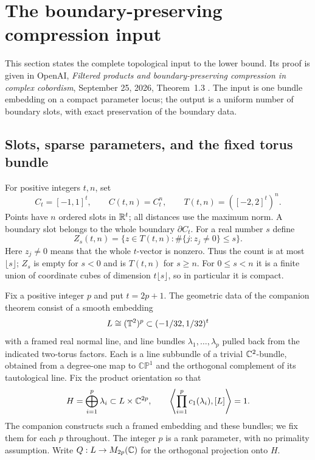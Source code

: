 \section{The boundary-preserving compression input}
\label{sec:compression-interface}

This section states the complete topological input to the lower bound.
Its proof is given in OpenAI, \emph{Filtered products and
boundary-preserving compression in complex cobordism}, September 25,
2026, Theorem~1.3 \cite{OpenAICompression2026}. The input is one
bundle embedding on a compact parameter locus; the output is a uniform
number of boundary slots, with exact preservation of the boundary data.

\subsection{Slots, sparse parameters, and the fixed torus bundle}

For positive integers $t,n$, set
\[
 C_t=[-1,1]^t,\qquad C(t,n)=C_t^n,
 \qquad T(t,n)=([-2,2]^t)^n.
\]
Points have $n$ ordered slots in $\mathbb R^t$; all distances use the maximum
norm. A boundary slot belongs to the whole boundary $\partial C_t$.
For a real number $s$ define
\begin{equation}
\label{eq:sparse-slots}
 Z_s(t,n)=\{z\in T(t,n):\#\{j:z_j\ne0\}\le s\}.
\end{equation}
Here $z_j\ne0$ means that the whole $t$-vector is nonzero. Thus the
count is at most $\lfloor s\rfloor$; $Z_s$ is empty for $s<0$ and
is $T(t,n)$ for $s\ge n$. For $0\le s<n$ it is a finite union of
coordinate cubes of dimension $t\lfloor s\rfloor$, so in particular
it is compact.

Fix a positive integer $p$ and put $t=2p+1$. The geometric data of the
companion theorem consist of a smooth embedding
\[
 L\cong(\mathbb T^2)^p\subset(-1/32,1/32)^t
\]
with a framed real normal line, and line bundles
$\lambda_1,\ldots,\lambda_p$ pulled back from the indicated two-torus
factors. Each is a line subbundle of a trivial $\mathbb C^2$-bundle, obtained
from a degree-one map to $\mathbb{CP}^1$ and the orthogonal complement
of its tautological line. Fix the product orientation so that
\[
 H=\bigoplus_{i=1}^p\lambda_i\subset L\times\mathbb C^{2p},
 \qquad
 \left\langle\prod_{i=1}^p c_1(\lambda_i),[L]\right\rangle=1.
\]
The companion constructs such a framed embedding and these bundles;
we fix them for each $p$ throughout. The integer $p$ is a rank parameter,
with no primality assumption. Write $Q:L\to M_{2p}(\mathbb C)$ for the
orthogonal projection onto $H$.

